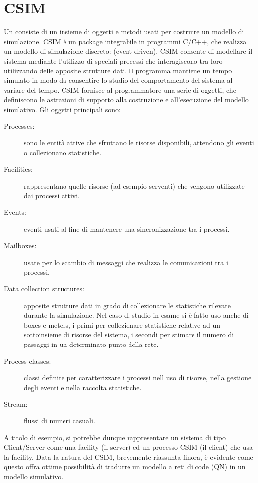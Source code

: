 \section{CSIM}
Un  consiste di un insieme di oggetti e metodi usati per costruire un modello di simulazione. CSIM è un package  integrabile in programmi C/C++, che realizza un modello di simulazione discreto:  (event-driven). CSIM consente di modellare il sistema mediante l’utilizzo di speciali processi che interagiscono tra loro utilizzando delle apposite strutture dati. Il programma mantiene un tempo simulato in modo da consentire lo studio del comportamento del sistema al variare del tempo. CSIM fornisce al programmatore una serie di oggetti, che definiscono le astrazioni di supporto alla costruzione e all’esecuzione del modello simulativo. Gli oggetti principali sono:
\begin{description}
	\item[Processes:] sono le entità attive che sfruttano le risorse disponibili, attendono gli eventi o collezionano statistiche.
	\item[Facilities:] rappresentano quelle risorse (ad esempio serventi) che vengono utilizzate dai processi attivi. 
	\item[Events:] eventi usati al fine di mantenere una sincronizzazione tra i processi.
	\item[Mailboxes:] usate per lo scambio di messaggi che realizza le comunicazioni tra i processi. 
	\item[Data collection structures:] apposite strutture dati in grado di collezionare le statistiche rilevate durante la simulazione. Nel caso di studio in esame si è fatto uso anche di boxes e meters, i primi per collezionare statistiche relative ad un sottoinsieme di risorse del sistema, i secondi per stimare il numero di passaggi in un determinato punto della rete.
	\item[Process classes:] classi definite per caratterizzare i processi nell uso di risorse, nella gestione degli eventi e nella raccolta statistiche. 
	\item[Stream:] flussi di numeri casuali. 
\end{description}
A titolo di esempio, si potrebbe dunque rappresentare un sistema di tipo Client/Server come una facility (il server) ed un processo CSIM (il client) che usa la facility. Data la natura del CSIM, brevemente riassunta finora, è evidente come questo offra ottime possibilità di tradurre un modello a reti di code (QN) in un modello simulativo.

